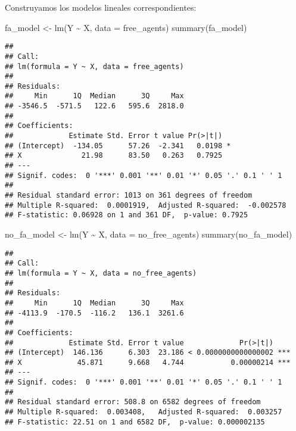 \documentclass[
]{article}
\newenvironment{Shaded}{\begin{snugshade}}{\end{snugshade}}
\newcommand{\AttributeTok}[1]{\textcolor[rgb]{0.77,0.63,0.00}{#1}}
\newcommand{\FunctionTok}[1]{\textcolor[rgb]{0.00,0.00,0.00}{#1}}
\newcommand{\NormalTok}[1]{#1}
\newcommand{\OtherTok}[1]{\textcolor[rgb]{0.56,0.35,0.01}{#1}}
\newcommand{\SpecialCharTok}[1]{\textcolor[rgb]{0.00,0.00,0.00}{#1}}
\begin{document}
Construyamos los modelos lineales correspondientes:

\begin{Shaded}
\begin{Highlighting}[]
\NormalTok{fa\_model }\OtherTok{\textless{}{-}} \FunctionTok{lm}\NormalTok{(Y }\SpecialCharTok{\textasciitilde{}}\NormalTok{ X, }\AttributeTok{data =}\NormalTok{ free\_agents)}
\FunctionTok{summary}\NormalTok{(fa\_model)}
\end{Highlighting}
\end{Shaded}

\begin{verbatim}
## 
## Call:
## lm(formula = Y ~ X, data = free_agents)
## 
## Residuals:
##     Min      1Q  Median      3Q     Max 
## -3546.5  -571.5   122.6   595.6  2818.0 
## 
## Coefficients:
##             Estimate Std. Error t value Pr(>|t|)  
## (Intercept)  -134.05      57.26  -2.341   0.0198 *
## X              21.98      83.50   0.263   0.7925  
## ---
## Signif. codes:  0 '***' 0.001 '**' 0.01 '*' 0.05 '.' 0.1 ' ' 1
## 
## Residual standard error: 1013 on 361 degrees of freedom
## Multiple R-squared:  0.0001919,  Adjusted R-squared:  -0.002578 
## F-statistic: 0.06928 on 1 and 361 DF,  p-value: 0.7925
\end{verbatim}

\begin{Shaded}
\begin{Highlighting}[]
\NormalTok{no\_fa\_model }\OtherTok{\textless{}{-}} \FunctionTok{lm}\NormalTok{(Y }\SpecialCharTok{\textasciitilde{}}\NormalTok{ X, }\AttributeTok{data =}\NormalTok{ no\_free\_agents)}
\FunctionTok{summary}\NormalTok{(no\_fa\_model)}
\end{Highlighting}
\end{Shaded}

\begin{verbatim}
## 
## Call:
## lm(formula = Y ~ X, data = no_free_agents)
## 
## Residuals:
##     Min      1Q  Median      3Q     Max 
## -4113.9  -170.5  -116.2   136.1  3261.6 
## 
## Coefficients:
##             Estimate Std. Error t value             Pr(>|t|)    
## (Intercept)  146.136      6.303  23.186 < 0.0000000000000002 ***
## X             45.871      9.668   4.744           0.00000214 ***
## ---
## Signif. codes:  0 '***' 0.001 '**' 0.01 '*' 0.05 '.' 0.1 ' ' 1
## 
## Residual standard error: 508.8 on 6582 degrees of freedom
## Multiple R-squared:  0.003408,   Adjusted R-squared:  0.003257 
## F-statistic: 22.51 on 1 and 6582 DF,  p-value: 0.000002135
\end{verbatim}
\end{document}
